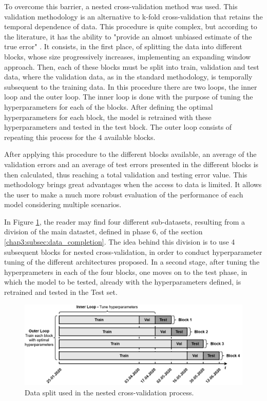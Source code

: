 To overcome this barrier, a nested cross-validation method was used. This validation methodology is an alternative to k-fold cross-validation that retains the temporal dependence of data. This procedure is quite complex, but according to the literature, it has the ability to "provide an almost unbiased estimate of the true error" \cite{nested}. It consists, in the first place, of splitting the data into different blocks, whose size progressively increases, implementing an expanding window approach. Then, each of these blocks must be split into train, validation and test data, where the validation data, as in the standard methodology, is temporally subsequent to the training data. In this procedure there are two loops, the inner loop and the outer loop. The inner loop is done with the purpose of tuning the hyperparameters for each of the blocks. After defining the optimal hyperparameters for each block, the model is retrained with these hyperparameters and tested in the test block. The outer loop consists of repeating this process for the 4 available blocks. 

After applying this procedure to the different blocks available, an average of the validation errors and an average of test errors presented in the different blocks is then calculated, thus reaching a total validation and testing error value. This methodology brings great advantages when the access to data is limited. It allows the user to make a much more robust evaluation of the performance of each model considering multiple scenarios.

In Figure \ref{partition}, the reader may find four different sub-datasets, resulting from a division of the main datastet, defined in phase 6, of the section \ref{chap3:subsec:data_completion}. The idea behind this division is to use 4 subsequent blocks for nested cross-validation, in order to conduct hyperparameter tuning of the different architectures proposed. In a second stage, after tuning the hyperprameters in each of the four blocks, one moves on to the test phase, in which the model to be tested, already with the hyperparameters defined, is retrained and tested in the Test set.

\begin{figure}[h!]
    \centering
    \begin{center}
    \includegraphics[width=1\textwidth]{Images/hyptun_.png}
    \caption{Data split used in the nested cross-validation process.}
    \label{partition}
    \end{center}
\end{figure}

